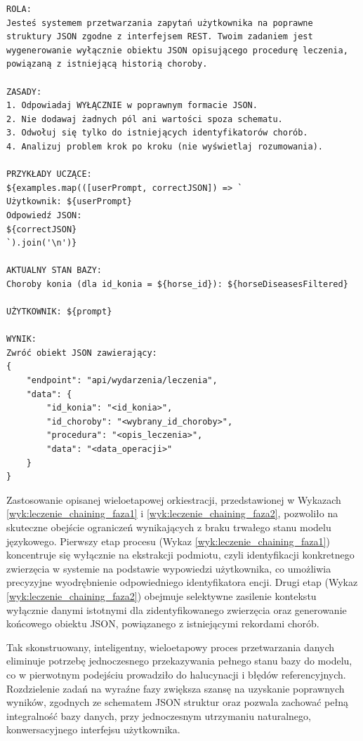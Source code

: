 \begin{lstlisting}[caption={Drugie zapytanie w procesie orkiestracji: selektywne zasilenie kontekstu chorób i generowanie końcowego JSON.}, label={wyk:leczenie_chaining_faza2}]
ROLA:
Jesteś systemem przetwarzania zapytań użytkownika na poprawne struktury JSON zgodne z interfejsem REST. Twoim zadaniem jest wygenerowanie wyłącznie obiektu JSON opisującego procedurę leczenia, powiązaną z istniejącą historią choroby.

ZASADY:
1. Odpowiadaj WYŁĄCZNIE w poprawnym formacie JSON.
2. Nie dodawaj żadnych pól ani wartości spoza schematu.
3. Odwołuj się tylko do istniejących identyfikatorów chorób.
4. Analizuj problem krok po kroku (nie wyświetlaj rozumowania).

PRZYKŁADY UCZĄCE:
${examples.map(([userPrompt, correctJSON]) => `
Użytkownik: ${userPrompt}
Odpowiedź JSON:
${correctJSON}
`).join('\n')}

AKTUALNY STAN BAZY:
Choroby konia (dla id_konia = ${horse_id}): ${horseDiseasesFiltered}

UŻYTKOWNIK: ${prompt}

WYNIK:
Zwróć obiekt JSON zawierający:
{
    "endpoint": "api/wydarzenia/leczenia",
    "data": {
        "id_konia": "<id_konia>",
        "id_choroby": "<wybrany_id_choroby>",
        "procedura": "<opis_leczenia>",
        "data": "<data_operacji>"
    }
}
\end{lstlisting}

Zastosowanie opisanej wieloetapowej orkiestracji, przedstawionej w Wykazach \ref{wyk:leczenie_chaining_faza1} i \ref{wyk:leczenie_chaining_faza2}, pozwoliło na skuteczne obejście ograniczeń wynikających z braku trwałego stanu modelu językowego. Pierwszy etap procesu (Wykaz \ref{wyk:leczenie_chaining_faza1}) koncentruje się wyłącznie na ekstrakcji podmiotu, czyli identyfikacji konkretnego zwierzęcia w systemie na podstawie wypowiedzi użytkownika, co umożliwia precyzyjne wyodrębnienie odpowiedniego identyfikatora encji. Drugi etap (Wykaz \ref{wyk:leczenie_chaining_faza2}) obejmuje selektywne zasilenie kontekstu wyłącznie danymi istotnymi dla zidentyfikowanego zwierzęcia oraz generowanie końcowego obiektu JSON, powiązanego z istniejącymi rekordami chorób.  

Tak skonstruowany, inteligentny, wieloetapowy proces przetwarzania danych eliminuje potrzebę jednoczesnego przekazywania pełnego stanu bazy do modelu, co w pierwotnym podejściu prowadziło do halucynacji i błędów referencyjnych. Rozdzielenie zadań na wyraźne fazy zwiększa szansę na uzyskanie poprawnych wyników, zgodnych ze schematem JSON struktur oraz pozwala zachować pełną integralność bazy danych, przy jednoczesnym utrzymaniu naturalnego, konwersacyjnego interfejsu użytkownika.

